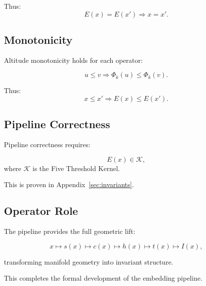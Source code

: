 Thus:
\[
E(x) = E(x') \Rightarrow x = x'.
\]

\subsection{Monotonicity}

Altitude monotonicity holds for each operator:

\[
u \le v \Rightarrow \Phi_k(u) \le \Phi_k(v).
\]

Thus:
\[
x \le x' \Rightarrow E(x) \le E(x').
\]

\subsection{Pipeline Correctness}

Pipeline correctness requires:

\[
E(x) \in \mathcal{K},
\]
where $\mathcal{K}$ is the Five Threshold Kernel.

This is proven in Appendix~\ref{sec:invariants}.

\subsection{Operator Role}

The pipeline provides the full geometric lift:

\[
x
\mapsto s(x)
\mapsto c(x)
\mapsto h(x)
\mapsto t(x)
\mapsto I(x),
\]

transforming manifold geometry into invariant structure.

This completes the formal development of the embedding pipeline.
